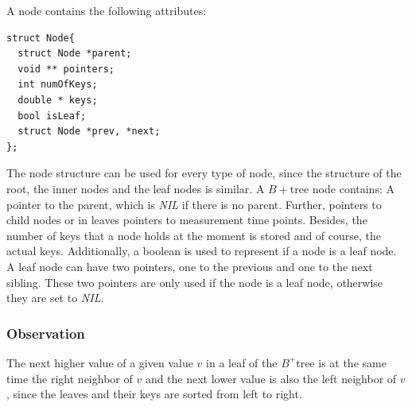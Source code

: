 \documentclass[abstracton,12pt,oneside]{scrreprt}
\begin{document}
A node contains the following attributes: 
\lstset{language=C}
\begin{lstlisting}
struct Node{
  struct Node *parent;
  void ** pointers;
  int numOfKeys;
  double * keys;
  bool isLeaf;
  struct Node *prev, *next;
};
\end{lstlisting}
\BlankLine
The node structure can be used for every type of node, since the structure of the root, the inner nodes and the leaf nodes is similar. A $B+$tree node contains: A pointer to the parent, which is \emph{NIL} if there is no parent. Further, pointers to child nodes or in leaves pointers to measurement time points. Besides, the number of keys that a node holds at the moment is stored and of course, the actual keys. Additionally, a boolean is used to represent if a node is a leaf node. A leaf node can have two pointers, one to the previous and one to the next sibling. These two pointers are only used if the node is a leaf node, otherwise they are set to \emph{NIL}.

\subsubsection{Observation}
The next higher value of a given value $v$ in a leaf of the $B^+$tree is at the same time the right neighbor of $v$ and the next lower value is also the left neighbor of $v$, since the leaves and their keys are sorted from left to right. 
\end{document}
